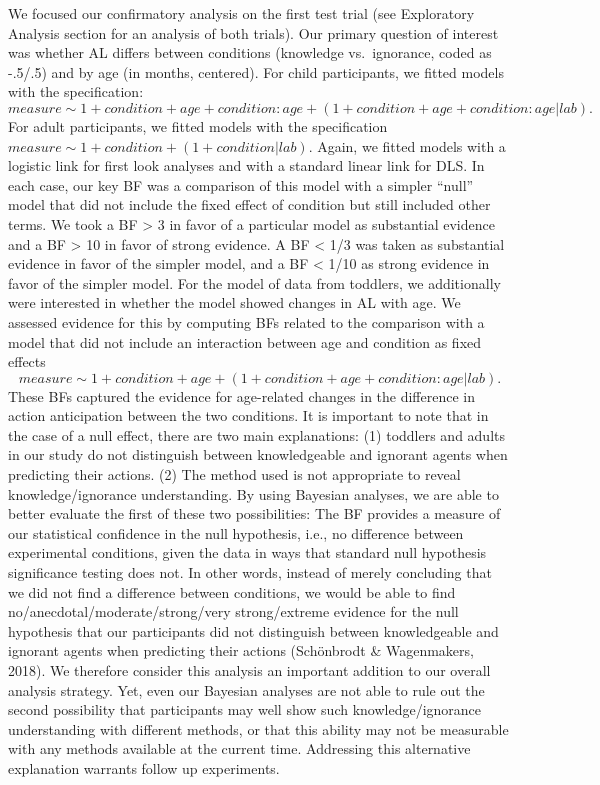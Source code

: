 \documentclass[
  man,floatsintext]{apa6}
\begin{document}
We focused our confirmatory analysis on the first test trial (see Exploratory Analysis section for an analysis of both trials). Our primary question of interest was whether AL differs between conditions (knowledge vs.~ignorance, coded as -.5/.5) and by age (in months, centered). For child participants, we fitted models with the specification:
\(measure \sim 1 + condition + age + condition:age + (1 + condition + age + condition:age | lab).\)
For adult participants, we fitted models with the specification
\(measure \sim 1 + condition + (1 + condition | lab).\)
Again, we fitted models with a logistic link for first look analyses and with a standard linear link for DLS.
In each case, our key BF was a comparison of this model with a simpler ``null'' model that did not include the fixed effect of condition but still included other terms. We took a BF \textgreater{} 3 in favor of a particular model as substantial evidence and a BF \textgreater{} 10 in favor of strong evidence. A BF \textless{} 1/3 was taken as substantial evidence in favor of the simpler model, and a BF \textless{} 1/10 as strong evidence in favor of the simpler model.
For the model of data from toddlers, we additionally were interested in whether the model showed changes in AL with age. We assessed evidence for this by computing BFs related to the comparison with a model that did not include an interaction between age and condition as fixed effects
\[measure \sim 1 + condition + age + (1 + condition + age + condition:age | lab).\]
These BFs captured the evidence for age-related changes in the difference in action anticipation between the two conditions.
It is important to note that in the case of a null effect, there are two main explanations: (1) toddlers and adults in our study do not distinguish between knowledgeable and ignorant agents when predicting their actions. (2) The method used is not appropriate to reveal knowledge/ignorance understanding. By using Bayesian analyses, we are able to better evaluate the first of these two possibilities: The BF provides a measure of our statistical confidence in the null hypothesis, i.e., no difference between experimental conditions, given the data in ways that standard null hypothesis significance testing does not. In other words, instead of merely concluding that we did not find a difference between conditions, we would be able to find no/anecdotal/moderate/strong/very strong/extreme evidence for the null hypothesis that our participants did not distinguish between knowledgeable and ignorant agents when predicting their actions (Schönbrodt \& Wagenmakers, 2018). We therefore consider this analysis an important addition to our overall analysis strategy. Yet, even our Bayesian analyses are not able to rule out the second possibility that participants may well show such knowledge/ignorance understanding with different methods, or that this ability may not be measurable with any methods available at the current time. Addressing this alternative explanation warrants follow up experiments.
\end{document}
